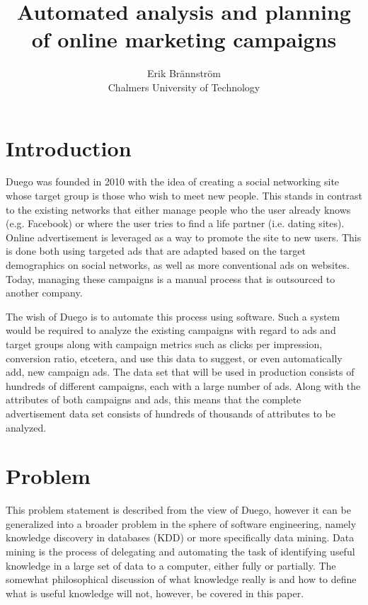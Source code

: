 \documentclass[a4paper]{article}
\begin{document}
\title{Automated analysis and planning of online marketing campaigns}
\author{Erik Brännström\\
  Chalmers University of Technology}
\date{}
\maketitle

\section{Introduction}
Duego was founded in 2010 with the idea of creating a social networking site whose target group is those who wish to meet new
people. This stands in contrast to the existing networks that either manage people who the user already knows (e.g. Facebook)
or where the user tries to find a life partner (i.e. dating sites). Online advertisement is leveraged as a way to promote the
site to new users. This is done both using targeted ads that are adapted based on the target demographics on social networks,
as well as more conventional ads on websites. Today, managing these campaigns is a manual process that is outsourced to
another company.

The wish of Duego is to automate this process using software. Such a system would be required to analyze the existing campaigns
with regard to ads and target groups along with campaign metrics such as clicks per impression, conversion ratio, etcetera, and
use this data to suggest, or even automatically add, new campaign ads. The data set that will be used in production consists of
hundreds of different campaigns, each with a large number of ads. Along with the attributes of both campaigns and ads, this means
that the complete advertisement data set consists of hundreds of thousands of attributes to be analyzed.

\section{Problem}
This problem statement is described from the view of Duego, however it can be generalized into a broader problem in the sphere of
software engineering, namely knowledge discovery in databases (KDD) or more specifically data mining. Data mining is the process
of delegating and automating the task of identifying useful knowledge in a large set of data to a computer, either fully or
partially. The somewhat philosophical discussion of what knowledge really is and how to define what is useful knowledge will not,
however, be covered in this paper.
\end{document}
